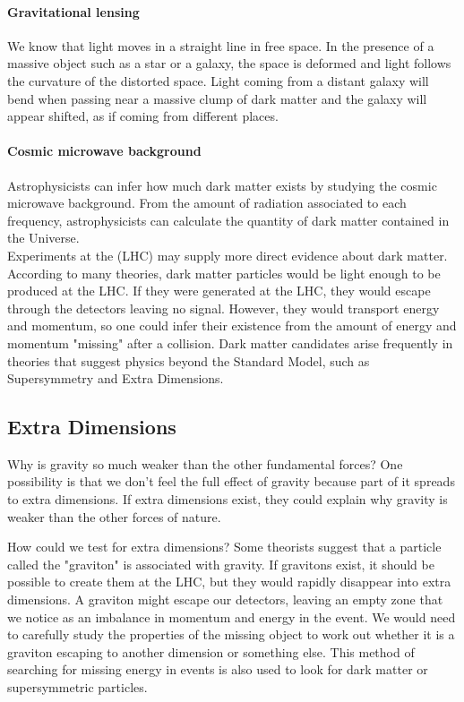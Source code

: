 \paragraph{Gravitational lensing} We know that light moves in a straight line in free space. In the presence of a massive object such as a star or a galaxy, the space is deformed and light follows the curvature of the distorted space. Light coming from a distant galaxy will bend when passing near a massive clump of dark matter and the galaxy will appear shifted, as if coming from different places.
\paragraph{Cosmic microwave background} Astrophysicists can infer how much dark matter exists by studying the cosmic microwave background. From the amount of radiation associated to each frequency, astrophysicists can calculate the quantity of dark matter contained in the Universe.\\

\indent Experiments at the (LHC) may supply more direct evidence about dark matter. According to many theories, dark matter particles would be light enough to be produced at the LHC. If they were generated at the LHC, they would escape through the detectors leaving no signal. However, they would transport energy and momentum, so one could infer their existence from the amount of energy and momentum "missing" after a collision. Dark matter candidates arise frequently in theories that suggest physics beyond the Standard Model, such as Supersymmetry and Extra Dimensions.

\subsection{Extra Dimensions}

Why is gravity so much weaker than the other fundamental forces?  One possibility is that we don’t feel the full effect of gravity  because part of it spreads to extra dimensions. If extra dimensions exist, they could explain why gravity is weaker than the other forces of nature.

How could we test for extra dimensions? 
Some theorists suggest that a particle called the "graviton" is associated with gravity. If gravitons exist, it should be possible to create them at the LHC, but they would rapidly disappear into extra dimensions. A graviton might escape our detectors, leaving an empty zone that we notice as an imbalance in momentum and energy in the event. We would need to carefully study the properties of the missing object to work out whether it is a graviton escaping to another dimension or something else. This method of searching for missing energy in events is also used to look for dark matter or supersymmetric particles.

